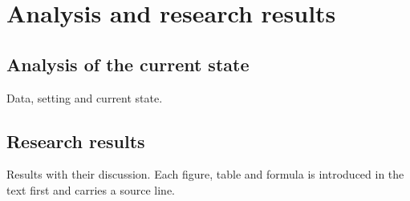 \chapter{Analysis and research results}

\section{Analysis of the current state}
Data, setting and current state.

\section{Research results}
Results with their discussion. Each figure, table and formula is
introduced in the text first and carries a source line.
